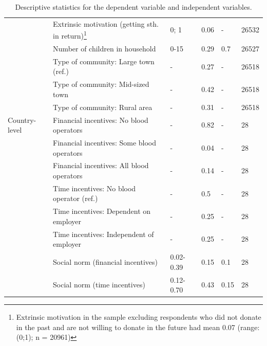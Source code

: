 \documentclass[AER]{AEA}
\begin{document}
\begin{table}[]
\begin{tabular}{l|l|l|l|l|l}
                 & Extrinsic motivation (getting sth. in return)\footnote{Extrinsic motivation in the sample excluding respondents who did not donate in the past and are not willing to donate in the future had mean 0.07 (range: (0;1); n = 20961)
} & 0; 1                       & 0.06                       & -     & 26532 \\
                 & Number of children in household                & 0-15                       & 0.29  & 0.7   & 26527 \\
                 & Type of community: Large town (ref.)           & -                          & 0.27  & -     & 26518 \\
                 & Type of community: Mid-sized town              & -                          & 0.42  & -     & 26518 \\
                 & Type of community: Rural area                  & -                          & 0.31                       & -     & 26518 \\
Country-level    & Financial incentives: No blood operators       & -                          & 0.82                       & -                          & 28                         \\
                 & Financial incentives: Some blood operators     & -                          & 0.04                       & -                          & 28                         \\
                 & Financial incentives: All blood operators      & -                          & 0.14                       & -                          & 28                         \\
                 & Time incentives: No blood operator (ref.)      & -                          & 0.5                        & -                          & 28                         \\
                 & Time incentives: Dependent on employer         & -                          & 0.25                       & -                          & 28                         \\
                 & Time incentives: Independent of employer       & -                          & 0.25                       & -                          & 28                         \\
                 & Social norm (financial incentives)             & 0.02-0.39                  & 0.15                       & 0.1                        & 28                         \\
                 & Social norm (time incentives)                  & 0.12-0.70                  & 0.43                       & 0.15                       & 28                        
\end{tabular}
\caption{Descriptive statistics for the dependent variable and independent variables.}
\label{table:1}
\end{table}
\end{document}
